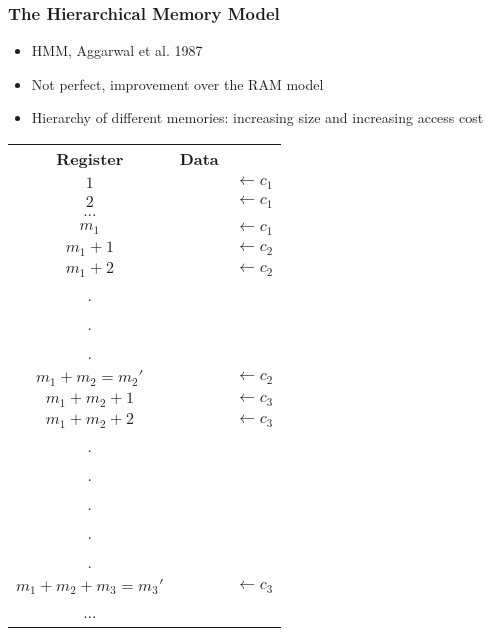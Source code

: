 \documentclass{beamer}
\theoremstyle{plain}
\begin{document}
\begin{frame} \frametitle{The Hierarchical Memory Model}\label{The Hierarchical Memory Model}

\begin{multicols}{2}
\begin{itemize}

\item HMM, Aggarwal et al. 1987
\item Not perfect, improvement over the RAM model
\item Hierarchy of different memories: increasing size and increasing access cost

\end{itemize}
\columnbreak

\begin{tiny}
\begin{center}
\begin{tabular}{ |c|c|c}
\cline{1-2}
 \textbf{Register} & \textbf{Data} \\\cline{1-2}
 $1$ & & $\leftarrow c_1$ \\\cline{1-2}
 $2$ & & $\leftarrow c_1$ \\\cline{1-2}
 $...$ & &  \\\cline{1-2}
 $m_1$ & & $\leftarrow c_1$ \\ \hhline{==~}
 
 $m_1 + 1$ & & $\leftarrow c_2$ \\\cline{1-2}
 $m_1 + 2$ & & $\leftarrow c_2$ \\\cline{1-2}
 . & &  \\\cline{1-2}
 . & &  \\\cline{1-2}
 . & &  \\\cline{1-2}
 $m_1+m_2=m_2'$ & & $\leftarrow c_2$ \\ \hhline{==~}
 $m_1+m_2 + 1$ & & $\leftarrow c_3$ \\\cline{1-2}
 $m_1+m_2 + 2$ & & $\leftarrow c_3$ \\\cline{1-2}
 . & &  \\\cline{1-2}
 . & &  \\\cline{1-2}
 . & &  \\\cline{1-2}
 . & &  \\\cline{1-2}
 . & &  \\\cline{1-2}
 $m_1+m_2+m_3=m_3'$ & & $\leftarrow c_3$ \\ \hhline{==~}
 ... & 
\end{tabular}
\end{center}
\end{tiny}
\end{multicols}
\end{frame}
\end{document}
